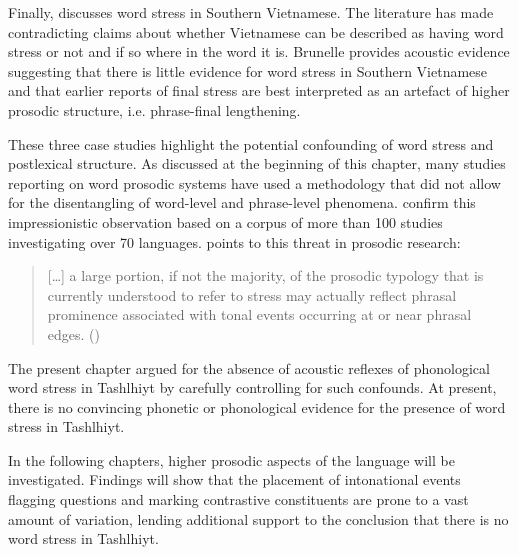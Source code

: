 Finally, \citet{brunelle2017} discusses word stress in Southern Vietnamese. The literature has made contradicting claims about whether Vietnamese can be described as having word stress or not and if so where in the word it is. Brunelle provides acoustic evidence suggesting that there is little evidence for word stress in Southern Vietnamese and that earlier reports of final stress are best interpreted as an artefact of higher prosodic structure, i.e. phrase-final lengthening.

These three case studies highlight the potential confounding of word stress and postlexical structure. As discussed at the beginning of this chapter, many studies reporting on word prosodic systems have used a methodology that did not allow for the disentangling of word-level and phrase-level phenomena. \citet{RoettgerGordon.underreview} confirm this impressionistic observation based on a corpus of more than 100 studies investigating over 70 languages. \citet{Gordon2014} points to this threat in prosodic research: 

\begin{quote}
 […] a large portion, if not the majority, of the prosodic typology that is currently understood to refer to stress may actually reflect phrasal prominence associated with tonal events occurring at or near phrasal edges. (\citealt[111]{Gordon2014})
\end{quote}

The present chapter argued for the absence of acoustic reflexes of phonological word stress in Tashlhiyt by carefully controlling for such confounds. At present, there is no convincing phonetic or phonological evidence for the presence of word stress in Tashlhiyt.

In the following chapters, higher prosodic aspects of the language will be investigated. Findings will show that the placement of intonational events flagging questions and marking contrastive constituents are prone to a vast amount of variation, lending additional support to the conclusion that there is no word stress in Tashlhiyt. 

